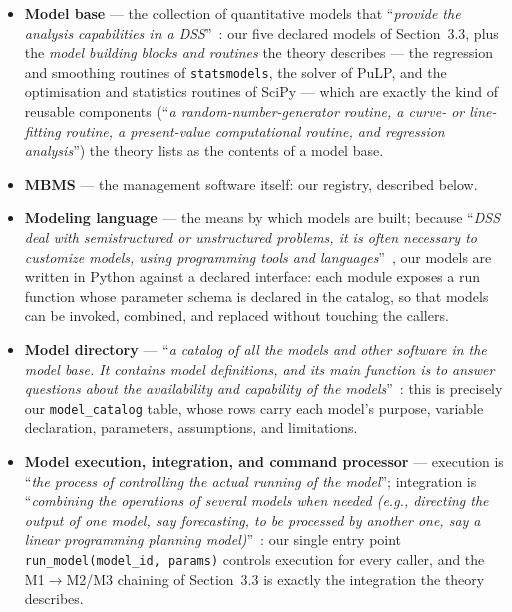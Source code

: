 \begin{itemize}
  \item \textbf{Model base} --- the collection of quantitative models that ``\emph{provide the analysis capabilities in a DSS}''~\cite{turban2011}: our five declared models of Section~3.3, plus the \emph{model building blocks and routines} the theory describes --- the regression and smoothing routines of \texttt{statsmodels}, the solver of PuLP, and the optimisation and statistics routines of SciPy --- which are exactly the kind of reusable components (``\emph{a random-number-generator routine, a curve- or line-fitting routine, a present-value computational routine, and regression analysis}'') the theory lists as the contents of a model base.
  \item \textbf{MBMS} --- the management software itself: our registry, described below.
  \item \textbf{Modeling language} --- the means by which models are built; because ``\emph{DSS deal with semistructured or unstructured problems, it is often necessary to customize models, using programming tools and languages}''~\cite{turban2011}, our models are written in Python against a declared interface: each module exposes a run function whose parameter schema is declared in the catalog, so that models can be invoked, combined, and replaced without touching the callers.
  \item \textbf{Model directory} --- ``\emph{a catalog of all the models and other software in the model base. It contains model definitions, and its main function is to answer questions about the availability and capability of the models}''~\cite{turban2011}: this is precisely our \texttt{model\_catalog} table, whose rows carry each model's purpose, variable declaration, parameters, assumptions, and limitations.
  \item \textbf{Model execution, integration, and command processor} --- execution is ``\emph{the process of controlling the actual running of the model}''; integration is ``\emph{combining the operations of several models when needed (e.g., directing the output of one model, say forecasting, to be processed by another one, say a linear programming planning model)}''~\cite{turban2011}: our single entry point \texttt{run\_model(model\_id, params)} controls execution for every caller, and the M1$\to$M2/M3 chaining of Section~3.3 is exactly the integration the theory describes.
\end{itemize}

